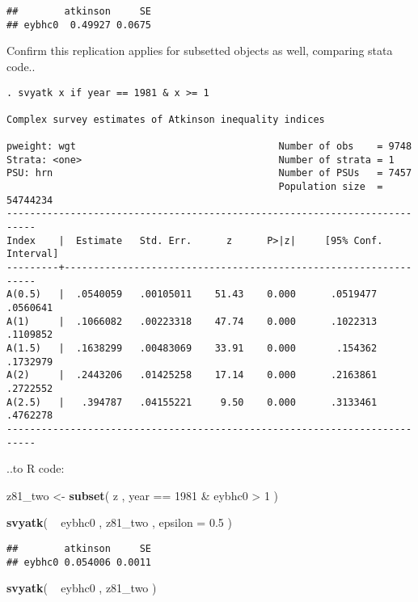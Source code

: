 \documentclass[]{book}
\newenvironment{Shaded}{\begin{snugshade}}{\end{snugshade}}
\newcommand{\KeywordTok}[1]{\textcolor[rgb]{0.13,0.29,0.53}{\textbf{{#1}}}}
\newcommand{\DataTypeTok}[1]{\textcolor[rgb]{0.13,0.29,0.53}{{#1}}}
\newcommand{\DecValTok}[1]{\textcolor[rgb]{0.00,0.00,0.81}{{#1}}}
\newcommand{\FloatTok}[1]{\textcolor[rgb]{0.00,0.00,0.81}{{#1}}}
\newcommand{\StringTok}[1]{\textcolor[rgb]{0.31,0.60,0.02}{{#1}}}
\newcommand{\NormalTok}[1]{{#1}}
\theoremstyle{definition}
\theoremstyle{definition}
\theoremstyle{remark}
\begin{document}
\begin{verbatim}
##        atkinson     SE
## eybhc0  0.49927 0.0675
\end{verbatim}

Confirm this replication applies for subsetted objects as well,
comparing stata code..

\begin{verbatim}
. svyatk x if year == 1981 & x >= 1

Complex survey estimates of Atkinson inequality indices
 
pweight: wgt                                   Number of obs    = 9748
Strata: <one>                                  Number of strata = 1
PSU: hrn                                       Number of PSUs   = 7457
                                               Population size  = 54744234
---------------------------------------------------------------------------
Index    |  Estimate   Std. Err.      z      P>|z|     [95% Conf. Interval]
---------+-----------------------------------------------------------------
A(0.5)   |  .0540059   .00105011    51.43    0.000      .0519477   .0560641
A(1)     |  .1066082   .00223318    47.74    0.000      .1022313   .1109852
A(1.5)   |  .1638299   .00483069    33.91    0.000       .154362   .1732979
A(2)     |  .2443206   .01425258    17.14    0.000      .2163861   .2722552
A(2.5)   |   .394787   .04155221     9.50    0.000      .3133461   .4762278
---------------------------------------------------------------------------
\end{verbatim}

..to R code:

\begin{Shaded}
\begin{Highlighting}[]
\NormalTok{z81_two <-}\StringTok{ }\KeywordTok{subset}\NormalTok{( z , year ==}\StringTok{ }\DecValTok{1981} \NormalTok{&}\StringTok{ }\NormalTok{eybhc0 >}\StringTok{ }\DecValTok{1} \NormalTok{)}

\KeywordTok{svyatk}\NormalTok{( ~}\StringTok{ }\NormalTok{eybhc0 , z81_two , }\DataTypeTok{epsilon =} \FloatTok{0.5} \NormalTok{)}
\end{Highlighting}
\end{Shaded}

\begin{verbatim}
##        atkinson     SE
## eybhc0 0.054006 0.0011
\end{verbatim}

\begin{Shaded}
\begin{Highlighting}[]
\KeywordTok{svyatk}\NormalTok{( ~}\StringTok{ }\NormalTok{eybhc0 , z81_two )}
\end{Highlighting}
\end{Shaded}
\end{document}
